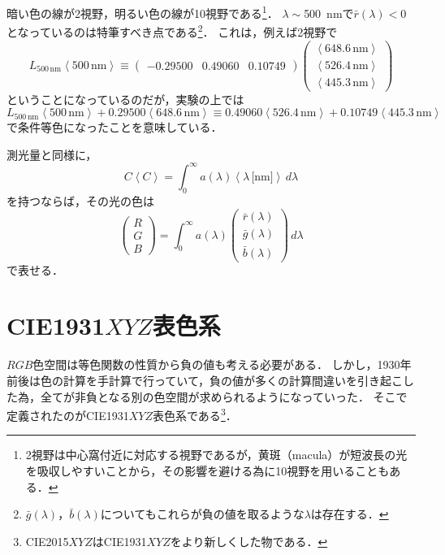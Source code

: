 \documentclass[uplatex,paper=a4,fontsize=4.0truemm,jafontsize=4.0truemm,head_space=30.0truemm,foot_space=30.0truemm,baselineskip=8.0truemm,line_length=40zw,gutter=25.0truemm,oneside,openany,fleqn,hanging_panctuation,open_bracket_pos=nibu_tentsuki,dvipdfmx,jis2004,book,titlepage]{jlreq}
\theoremstyle{mystyle}
\newcommand{\mathdisplaystyle}[1]{\(\displaystyle{#1}\)}
\newcommand{\negativevalue}[1]{{-#1}}
\newcommand{\parentheses}[1]{\left(#1\right)}
\newcommand{\anglebrackets}[1]{\left\langle#1\right\rangle}
\newcommand{\easymatrix}[1]{\mathord{\begin{pmatrix}#1\end{pmatrix}}}
\begin{document}
			暗い色の線が2\textdegree 視野，明るい色の線が10\textdegree 視野である\footnote{2\textdegree 視野は中心窩付近に対応する視野であるが，黄斑（macula）が短波長の光を吸収しやすいことから，その影響を避ける為に10\textdegree 視野を用いることもある．}．
			\mathdisplaystyle{\lambda\sim{}}\SI{500}{nm}で\mathdisplaystyle{\bar{r}\parentheses{\lambda}<0}となっているのは特筆すべき点である\footnote{\mathdisplaystyle{\bar{g}\parentheses{\lambda}}，\mathdisplaystyle{\bar{b}\parentheses{\lambda}}についてもこれらが負の値を取るような\mathdisplaystyle{\lambda}は存在する．}．
			これは，例えば2\textdegree 視野で
			\begin{equation*}
				L_{500\,\textrm{nm}}\anglebrackets{500\,\textrm{nm}}\equiv \easymatrix{\negativevalue{0.29500} & 0.49060 & 0.10749}\easymatrix{\anglebrackets{648.6\,\textrm{nm}} \\ \anglebrackets{526.4\,\textrm{nm}} \\ \anglebrackets{445.3\,\textrm{nm}}}
			\end{equation*}
			ということになっているのだが，実験の上では
			\begin{equation*}
				L_{500\,\textrm{nm}}\anglebrackets{500\,\textrm{nm}}+0.29500\anglebrackets{648.6\,\textrm{nm}}\equiv0.49060\anglebrackets{526.4\,\textrm{nm}}+0.10749\anglebrackets{445.3\,\textrm{nm}}
			\end{equation*}
			で条件等色になったことを意味している．

			測光量と同様に，
			\begin{equation*}
				C\anglebrackets{C}=\int_0^\infty{a\parentheses{\lambda}\anglebrackets{\lambda\,\textrm{[nm]}}}\,d\lambda
			\end{equation*}
			を持つならば，その光の色は
			\begin{equation*}
				\easymatrix{R \\ G \\ B}=\int_0^\infty{a\parentheses{\lambda}\easymatrix{\bar{r}\parentheses{\lambda} \\ \bar{g}\parentheses{\lambda} \\ \bar{b}\parentheses{\lambda}}}\,d\lambda
			\end{equation*}
			で表せる．
		\section{CIE1931\mathdisplaystyle{XYZ}表色系}
			\mathdisplaystyle{RGB}色空間は等色関数の性質から負の値も考える必要がある．
			しかし，1930年前後は色の計算を手計算で行っていて，負の値が多くの計算間違いを引き起こした為，全てが非負となる別の色空間が求められるようになっていった．
			そこで定義されたのがCIE1931\mathdisplaystyle{XYZ}表色系である\footnote{CIE2015\mathdisplaystyle{XYZ}はCIE1931\mathdisplaystyle{XYZ}をより新しくした物である．}．
\end{document}
